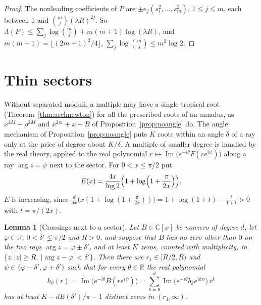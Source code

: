 \documentclass[11pt]{article}
\newtheorem{lemma}[theorem]{Lemma}
\newcommand{\R}{\mathbb R}
\begin{document}
\begin{proof}
The nonleading coefficients of $P$ are $\pm e_j(s_1^2,\ldots,s_m^2)$,
$1\le j\le m$, each between $1$ and $\binom mj(\lambda R)^{2j}$.  So
$\Lambda(P)\le\sum_j\log\binom mj+m(m+1)\log(\lambda R)$, and
$m(m+1)=\lfloor(2m+1)^2/4\rfloor$, $\sum_j\log\binom mj\le m^2\log2$.
\end{proof}


\section{Thin sectors}\label{sec:thin}

Without separated moduli, a multiple may have a single tropical root
(Theorem~\ref{thm:archnewton}) for all the prescribed roots of an annulus, as $x^{2M}+\rho^{2M}$ and
$x^{2m}+x+B$ of Proposition~\ref{prop:noangle} do.  The angle mechanism of
Proposition~\ref{prop:noangle} puts $K$ roots within an angle $\delta$ of a
ray only at the price of degree about $K/\delta$.  A multiple of smaller
degree is handled by the real theory, applied to the real polynomial
$r\mapsto\operatorname{Im}\bigl(e^{-i\theta}F(re^{i\psi})\bigr)$ along a ray
$\arg z=\psi$ next to the sector.  For $0<x\le\pi/2$ put
\[
  E(x)=\frac{4x}{\log2}\Bigl(1+\log\Bigl(1+\frac{\pi}{2x}\Bigr)\Bigr).
\]
$E$ is increasing, since
$\frac{d}{dx}\bigl(x(1+\log(1+\frac{\pi}{2x}))\bigr)=1+\log(1+t)-\frac t{1+t}>0$
with $t=\pi/(2x)$.

\begin{lemma}[Crossings next to a sector]\label{lem:sectorcount}
Let $B\in\mathbb C[x]$ be nonzero of degree $d$, let $\varphi\in\R$,
$0<\delta'\le\pi/2$ and $R>0$, and suppose that $B$ has no zero other than $0$
on the two rays $\arg z=\varphi\pm\delta'$, and at least $K$ zeros, counted
with multiplicity, in $\{z:|z|\ge R,\ |\arg z-\varphi|<\delta'\}$.  Then there are
$r_1\in[R/2,R)$ and $\psi\in\{\varphi-\delta',\varphi+\delta'\}$ such that for
every $\theta\in\R$ the real polynomial
\[
  h_\theta(r)=\operatorname{Im}\bigl(e^{-i\theta}B(re^{i\psi})\bigr)
  =\sum_{k=0}^d\operatorname{Im}\bigl(e^{-i\theta}b_ke^{ik\psi}\bigr)\,r^k
\]
has at least $K-dE(\delta')/\pi-1$ distinct zeros in $(r_1,\infty)$.
\end{lemma}
\end{document}
